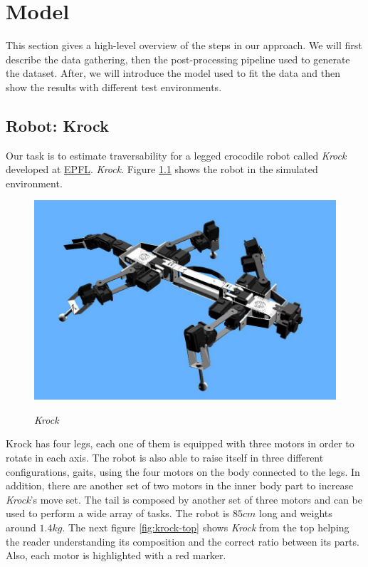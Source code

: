 \documentclass[../document.tex]{subfiles}
\begin{document}
\chapter{Model}
This section gives a high-level overview of the steps in our approach. We will first describe the data gathering,  then the post-processing pipeline used to generate the dataset. After, we will introduce the model used to fit the data and then show the results with different test environments.
\section{Robot: Krock}
Our task is to estimate traversability for a legged crocodile robot called \emph{Krock} developed at \href{https://duckduckgo.com/?q=EPFL&atb=v154-1__&ia=web}{EPFL}.
\emph{Krock}. Figure \ref{fig:krock} shows the robot in the simulated environment.
\begin{figure}[H]
    \centering
    \includegraphics[width=0.5\linewidth]{../img/krock-1.jpg}
    \label{fig:krock}
    \caption{\emph{Krock}}
\end{figure}
Krock has four legs, each one of them is equipped with three motors in order to rotate in each axis. The robot is also able to raise itself in three different configurations, gaits, using the four motors on the body connected to the legs. In addition, there are another set of two motors in the inner body part to increase \emph{Krock}'s move set. 
The tail is composed by another set of three motors and can be used to perform a wide array of tasks.
The robot is $85cm$ long and weights around $1.4kg$. The next figure \ref{fig:krock-top} shows \emph{Krock} from the top helping the reader understanding its composition and the correct ratio between its parts. Also, each motor is highlighted with a red marker.
\end{document}
